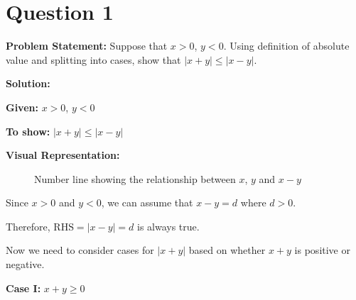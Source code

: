 \clearpage
\section*{Question 1}

\textbf{Problem Statement:} Suppose that $x > 0$, $y < 0$. Using definition of absolute value and splitting into cases, show that $|x + y| \leq |x - y|$.

\vspace{1em}

\textbf{Solution:}

\textbf{Given:} $x > 0$, $y < 0$

\textbf{To show:} $|x + y| \leq |x - y|$

\vspace{1em}

\textbf{Visual Representation:}

\begin{figure}[h!]
\centering
{}
\caption{Number line showing the relationship between $x$, $y$ and $x-y$}
\label{fig:q01_numberline}
\end{figure}

Since $x > 0$ and $y < 0$, we can assume that $x - y = d$ where $d > 0$.

Therefore, $\text{RHS} = |x - y| = d$ is always true.

Now we need to consider cases for $|x + y|$ based on whether $x + y$ is positive or negative.

\vspace{1em}

\textbf{Case I:} $x + y \geq 0$ 

